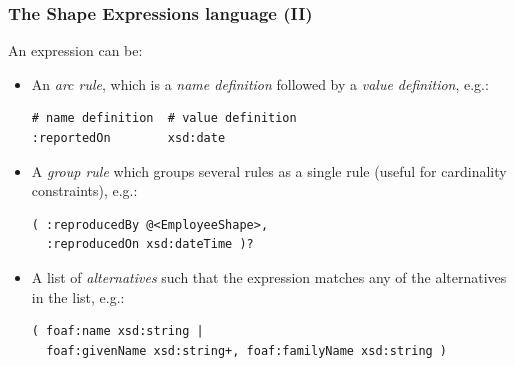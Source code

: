 \documentclass{beamer}
\begin{document}
\begin{frame}[fragile]
  \frametitle{The Shape Expressions language (II)}

  An expression can be:

  \begin{itemize}
    \item An \textit{arc rule}, which is a \textit{name
      definition} followed by a \textit{value definition}, e.g.:

    \begin{Verbatim}[fontsize=\scriptsize]
# name definition  # value definition
:reportedOn        xsd:date
    \end{Verbatim}

    \pause

    \item A \textit{group rule} which groups several rules as a single rule
      (useful for cardinality constraints), e.g.:

    \begin{Verbatim}[fontsize=\scriptsize]
( :reproducedBy @<EmployeeShape>,
  :reproducedOn xsd:dateTime )?
    \end{Verbatim}

    \pause

    \item A list of \textit{alternatives} such that the expression matches any
      of the alternatives in the list, e.g.:

    \begin{Verbatim}[fontsize=\scriptsize]
( foaf:name xsd:string |
  foaf:givenName xsd:string+, foaf:familyName xsd:string )
    \end{Verbatim}

  \end{itemize}
\end{frame}
\end{document}

